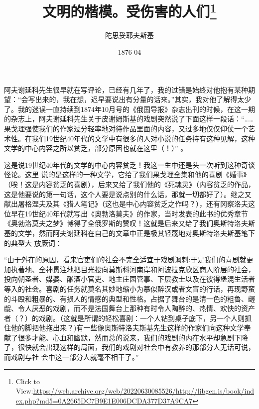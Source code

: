 \documentclass{article}
\title{文明的楷模。受伤害的人们\footnote{Click to View:\url{https://web.archive.org/web/20220630085526/http://libgen.is/book/index.php?md5=0A2665DC7B9E1E006DCDA377D37A9CA7}}}
\author{陀思妥耶夫斯基}
\date{1876-04}
\begin{document}

\maketitle


\Large

﻿阿夫谢延科先生很早就在写评论，已经有几年了，我的过错是始终对他抱有某种期望：“会写出来的，我在想，迟早要说出有分量的话来。”其实，我对他了解得太少了。我的迷误一直持续到1874年10月号的《俄国导报》杂志出刊的时候，在这一期的杂志上，阿夫谢延科先生关于皮谢姆斯基的戏剧突然说了下面这样一段话：“……果戈理强使我们的作家过分轻率地对待作品里面的内容，又过多地仅仅仰仗一个艺术性。在我们19世纪40年代的文学中有很多的人对小说的任务持有这种见解，这种文学的中心内容之所以贫乏，部分原因也就在这里（！）”
。 

这是说19世纪40年代的文学的中心内容贫乏！我这一生中还是头一次听到这种奇谈怪论。这里
\newpage
说的是这样的一种文学，它给了我们果戈理全集和他的喜剧《婚事》（唉！这是内容贫乏的喜剧），后来又给了我们他的《死魂灵》（内容贫乏的作品，这是他要说的第一句话，这个人要是说点别的什么话，那就一切都好了）。继之又献出屠格涅夫及其《猎人笔记》（这也是中心内容贫乏之作吗？），还有冈察洛夫这位早在19世纪40年代就写出《奥勃洛莫夫》的作家，当时发表的此书的优秀章节《奥勃洛莫夫之梦》博得了全俄罗斯的赞叹！这就是后来又给了我们奥斯特洛夫斯基的文学，然而阿夫谢延科在自己的文章中正是极其轻蔑地对奥斯特洛夫斯基笔下的典型大
放厥词： 

“由于外在的原因，看来官吏们的社会不完全适宜于戏剧讽刺:于是我们的喜剧就更加执著地、全神贯注地把目光投向莫斯科河南岸和阿波拉克欣区商人阶层的社会，投向朝圣者、媒婆、酗酒小官吏、地主庄园管事、下层教士以及在彼得堡混生活者等入的社会。喜剧的任务就莫名其妙地缩小为摹似醉汉或者文盲的行话，再现野蛮的斗殴和粗暴的、有损人的情感的典型和性格。占据了舞台的是清一色的粗鲁、龌
\newpage
龊、令人厌恶的戏剧，而不是法国舞台上那种有时令人陶醉的、热情、欢快的资产者（？）的戏剧。（这就是所谓的轻松喜剧：一个人钻到桌子底下，另一个人则抓住他的脚把他拖出来？)有一些像奥斯特洛夫斯基先生这样的作家们向这种文学奉献了很多才能、心血和幽默，然而总的说来，我们的戏剧的内在水平却急剧下降了，很快就会出现这样的局面，我们的戏剧对社会中有教养的那部分人无话可说，而戏剧与社
会中这一部分人就毫不相干了。” 
\end{document}
